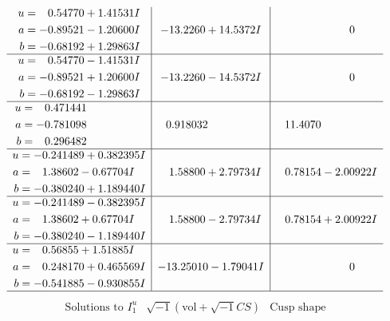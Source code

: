 \documentclass[1p]{elsarticle_modified}
\theoremstyle{definition}
\newcommand{\I}{\sqrt{-1}}
\begin{document}
$$\begin{array}{c|c|c}
\begin{aligned}
u &= \phantom{-}0.54770 + 1.41531 I \\
a &= -0.89521 - 1.20600 I \\
b &= -0.68192 + 1.29863 I\end{aligned}
 & -13.2260 + 14.5372 I & \phantom{-0.000000 } 0 \\ \hline\begin{aligned}
u &= \phantom{-}0.54770 - 1.41531 I \\
a &= -0.89521 + 1.20600 I \\
b &= -0.68192 - 1.29863 I\end{aligned}
 & -13.2260 - 14.5372 I & \phantom{-0.000000 } 0 \\ \hline\begin{aligned}
u &= \phantom{-}0.471441\phantom{ +0.000000I} \\
a &= -0.781098\phantom{ +0.000000I} \\
b &= \phantom{-}0.296482\phantom{ +0.000000I}\end{aligned}
 & \phantom{-}0.918032\phantom{ +0.000000I} & \phantom{-}11.4070\phantom{ +0.000000I} \\ \hline\begin{aligned}
u &= -0.241489 + 0.382395 I \\
a &= \phantom{-}1.38602 - 0.67704 I \\
b &= -0.380240 + 1.189440 I\end{aligned}
 & \phantom{-}1.58800 + 2.79734 I & \phantom{-}0.78154 - 2.00922 I \\ \hline\begin{aligned}
u &= -0.241489 - 0.382395 I \\
a &= \phantom{-}1.38602 + 0.67704 I \\
b &= -0.380240 - 1.189440 I\end{aligned}
 & \phantom{-}1.58800 - 2.79734 I & \phantom{-}0.78154 + 2.00922 I \\ \hline\begin{aligned}
u &= \phantom{-}0.56855 + 1.51885 I \\
a &= \phantom{-}0.248170 + 0.465569 I \\
b &= -0.541885 - 0.930855 I\end{aligned}
 & -13.25010 - 1.79041 I & \phantom{-0.000000 } 0\\
 \hline 
 \end{array}$$\newpage$$\begin{array}{c|c|c}  
\text{Solutions to }I^u_{1}& \I (\text{vol} + \sqrt{-1}CS) & \text{Cusp shape}\\

\end{array}$$
\end{document}
